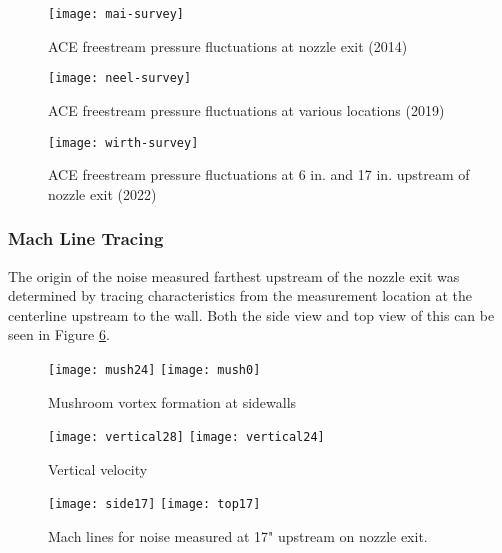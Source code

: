 \begin{figure}[ht]
    \centering
    \texttt{[image: mai-survey]}
    \caption[ACE freestream pressure fluctuations at nozzle exit (2014)]{ACE freestream pressure fluctuations at nozzle exit (2014) \cite{mai-dis}}
    \label{fig:mai-survey}
\end{figure}

\begin{figure}[ht]
    \centering
    \texttt{[image: neel-survey]}
    \caption[ACE freestream pressure fluctuations at various locations (2019)]{ACE freestream pressure fluctuations at various locations (2019) \cite{neel-dis}}
    \label{fig:neel-survey}
\end{figure}

\begin{figure}[ht]
    \centering
    \texttt{[image: wirth-survey]}
    \caption{ACE freestream pressure fluctuations at 6 in. and 17 in. upstream of nozzle exit (2022)}
    \label{fig:wirth-survey}
\end{figure}


\subsubsection*{Mach Line Tracing}

The origin of the noise measured farthest upstream of the nozzle exit was determined by tracing characteristics from the measurement location at the centerline upstream to the wall. Both the side view and top view of this can be seen in Figure \ref{fig:machlines}.

\begin{figure}[ht]
    \centering
    \texttt{[image: mush24]}
    \texttt{[image: mush0]}
    \caption{Mushroom vortex formation at sidewalls}
    \label{fig:mushrooms}
\end{figure}

\begin{figure}[ht]
    \centering
    \texttt{[image: vertical28]}
    \texttt{[image: vertical24]}
    \caption{Vertical velocity}
    \label{fig:vertical-vel}
\end{figure}

\begin{figure}[ht]
    \centering
    \texttt{[image: side17]}
    \texttt{[image: top17]}
    \caption{Mach lines for noise measured at 17" upstream on nozzle exit.}
    \label{fig:machlines}
\end{figure}

